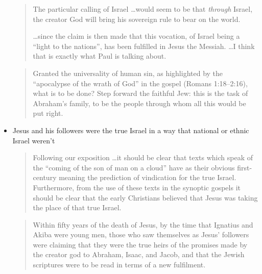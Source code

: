 \begin{itemize}
        \begin{quote}
            The particular calling of Israel \dots would seem to be that
            \textit{through} Israel, the creator God will bring his sovereign
            rule to bear on the world.

            \dots since the claim is then made that this vocation, of Israel
            being a \enquote{light to the nations}, has been fulfilled in Jesus
            the Messiah. \dots I think that is exactly what Paul is talking
            about.
            \autocite[805-806]{wright:2013}
        \end{quote}

        \begin{quote}
            Granted the universality of human sin, as highlighted by the
            \enquote{apocalypse of the wrath of God} in the gospel (Romans
            1:18--2:16), what is to be done? Step forward the faithful Jew: this
            is the task of Abraham's family, to be the people through whom all
            this would be put right.
            \autocite[811]{wright:2013}
        \end{quote}

    \item Jesus and his followers were the true Israel in a way that national or
        ethnic Israel weren't

        \begin{quote}
            Following our exposition \dots it should be clear that texts which
            speak of the \enquote{coming of the son of man on a cloud} have as
            their obvious first-century meaning the prediction of vindication
            for the true Israel. Furthermore, from the use of these texts in the
            synoptic gospels it should be clear that the early Christians
            believed that Jesus was taking the place of that true Israel.
            \autocite[461]{wright:1992}
        \end{quote}

        \begin{quote}
            Within fifty years of the death of Jesus, by the time that Ignatius
            and Akiba were young men, those who saw themselves as Jesus'
            followers were claiming that they were the true heirs of the
            promises made by the creator god to Abraham, Isaac, and Jacob, and
            that the Jewish scriptures were to be read in terms of a new
            fulfilment.


\end{quote}
\end{itemize}

